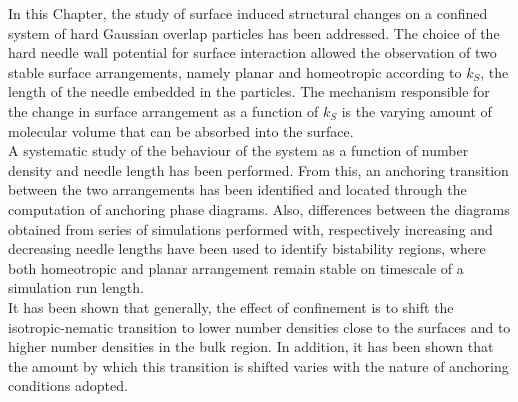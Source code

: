In this Chapter, the study of surface induced structural changes on a confined system of hard
Gaussian overlap particles has been addressed. The choice of the hard needle wall potential for
surface interaction allowed the observation of two stable surface arrangements, namely planar
and homeotropic according to $k_S$, the length of the needle embedded in the particles. The
mechanism responsible for the change in surface arrangement as a function of $k_S$ is the
varying amount of molecular volume that can be absorbed into the surface.\\
A systematic study of the behaviour of the system as a function of number density and needle 
length has been performed. From
this, an anchoring transition between the two arrangements has been identified and located
through the computation of anchoring phase diagrams. Also, differences between the diagrams
obtained from series of simulations performed with, respectively increasing and decreasing 
needle lengths have been used to identify bistability regions, where both homeotropic 
and planar arrangement remain stable on timescale of a simulation run length.\\ 
It has been shown that generally, the effect of confinement is to shift the isotropic-nematic 
transition to lower number densities close to the surfaces and to higher number densities 
in the bulk region.
In addition, it has been shown that the amount by which this transition is shifted varies with
the nature of anchoring conditions adopted.\\


